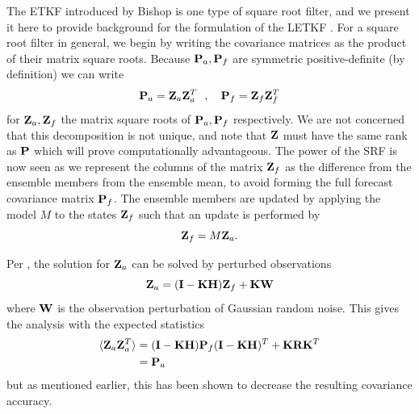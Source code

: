\documentclass[12pt]{report}
\begin{document}
The ETKF introduced by Bishop is one type of square root filter, and we present it here to provide background for the formulation of the LETKF .
For a square root filter in general, we begin by writing the covariance matrices as the product of their matrix square roots.
Because $\mathbf{P}_a,\mathbf{P}_f$ are symmetric positive-definite (by definition) we can write
\begin{equation} \mathbf{P}_a = \mathbf{Z}_a \mathbf{Z}_a^T ~~,~~~ \mathbf{P}_f = \mathbf{Z}_f \mathbf{Z}_f^T \end{equation}
for $\mathbf{Z}_a,\mathbf{Z}_f$ the matrix square roots of $\mathbf{P}_a,\mathbf{P}_f$ respectively.
We are not concerned that this decomposition is not unique, and note that $\mathbf{Z}$ must have the same rank as $\mathbf{P}$ which will prove computationally advantageous.
The power of the SRF is now seen as we represent the columns of the matrix $\mathbf{Z}_f$ as the difference from the ensemble members from the ensemble mean, to avoid forming the full forecast covariance matrix $\mathbf{P}_f$.
The ensemble members are updated by applying the model $M$ to the states $\mathbf{Z}_f$ such that an update is performed by
\begin{equation} \mathbf{Z}_f = M \mathbf{Z}_a .\end{equation}

Per , the solution for $\mathbf{Z}_a$ can be solved by perturbed observations
\begin{equation} \mathbf{Z}_a = (\mathbf{I} -\mathbf{K} \mathbf{H} ) \mathbf{Z} _f + \mathbf{K} \mathbf{W} \end{equation}
where $\mathbf{W}$ is the observation perturbation of Gaussian random noise.
This gives the analysis with the expected statistics
\begin{align} \langle \mathbf{Z}_a \mathbf{Z}_a^T \rangle &= (\mathbf{I}-\mathbf{K}\mathbf{H})\mathbf{P}_f(\mathbf{I}-\mathbf{K}\mathbf{H})^T + \mathbf{K}\mathbf{R}\mathbf{K}^T\\
&=\mathbf{P}_a \end{align}
but as mentioned earlier, this has been shown to decrease the resulting covariance accuracy.
\end{document}
